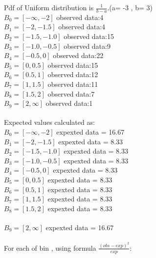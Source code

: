 \documentclass[11pt]{article}
\begin{document}
Pdf of Uniform distribution is $\frac{1}{b-a}$.(a= -3 , b= 3)\\

$B_0=[-\infty,-2]$ observed data:4\\

$B_1=[-2,-1.5]$ observed data:4\\

$B_2=[-1.5,-1.0]$ observed data:15\\

$B_3=[-1.0,-0.5]$ observed data:9\\

$B_4=[-0.5,0]$ observed data:22\\

$B_5=[0,0.5]$ observed data:15\\

$B_6=[0.5,1]$ observed data:12\\

$B_7=[1,1.5]$ observed data:11\\

$B_8=[1.5,2]$ observed data:7\\

$B_9=[2,\infty]$ observed data:1\\\\
Expected values calculated as:\\

$B_0=[-\infty,-2]$ expexted data = 16.67\\

$B_1=[-2,-1.5]$ expexted data = 8.33\\

$B_2=[-1.5,-1.0]$ expexted data = 8.33\\

$B_3=[-1.0,-0.5]$ expexted data = 8.33\\

$B_4=[-0.5,0]$ expexted data = 8.33\\

$B_5=[0,0.5]$ expexted data = 8.33\\

$B_6=[0.5,1]$ expexted data = 8.33\\

$B_7=[1,1.5]$ expexted data = 8.33\\

$B_8=[1.5,2]$ expexted data = 8.33\\\\

$B_9=[2,\infty]$ expexted data = 16.67\\\\
For each of bin , using formula $\frac{{(obs -exp)}^2}{exp}$:\\
\end{document}
